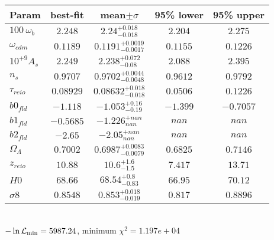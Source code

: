 \begin{tabular}{|l|c|c|c|c|} 
 \hline 
Param & best-fit & mean$\pm\sigma$ & 95\% lower & 95\% upper \\ \hline 
$100~\omega_{b }$ &$2.248$ & $2.24_{-0.018}^{+0.018}$ & $2.204$ & $2.275$ \\ 
$\omega_{cdm }$ &$0.1189$ & $0.1191_{-0.0017}^{+0.0019}$ & $0.1155$ & $0.1226$ \\ 
$10^{+9}A_{s }$ &$2.249$ & $2.238_{-0.08}^{+0.072}$ & $2.088$ & $2.395$ \\ 
$n_{s }$ &$0.9707$ & $0.9702_{-0.0048}^{+0.0044}$ & $0.9612$ & $0.9792$ \\ 
$\tau_{reio }$ &$0.08929$ & $0.08632_{-0.018}^{+0.018}$ & $0.0506$ & $0.1226$ \\ 
$b0_{fld }$ &$-1.118$ & $-1.053_{-0.19}^{+0.16}$ & $-1.399$ & $-0.7057$ \\ 
$b1_{fld }$ &$-0.5685$ & $-1.226_{nan}^{+nan}$ & $nan$ & $nan$ \\ 
$b2_{fld }$ &$-2.65$ & $-2.05_{nan}^{+nan}$ & $nan$ & $nan$ \\ 
$\Omega_{\Lambda }$ &$0.7002$ & $0.6987_{-0.0079}^{+0.0083}$ & $0.6825$ & $0.7146$ \\ 
$z_{reio }$ &$10.88$ & $10.6_{-1.5}^{+1.6}$ & $7.417$ & $13.71$ \\ 
$H0$ &$68.66$ & $68.54_{-0.83}^{+0.8}$ & $66.95$ & $70.12$ \\ 
$\sigma8$ &$0.8548$ & $0.853_{-0.019}^{+0.018}$ & $0.817$ & $0.8896$ \\ 
\hline 
 \end{tabular} \\ 
$-\ln{\cal L}_\mathrm{min} =5987.24$, minimum $\chi^2=1.197e+04$ \\ 
